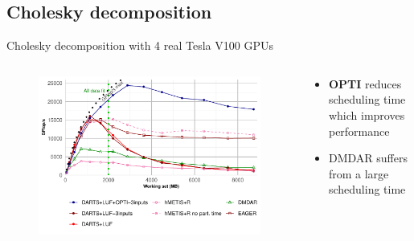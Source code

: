 \documentclass{libs/ufc_format}
\newcommand{\OPTI}{\textbf{OPTI}\xspace}
\begin{document}
\subsection{Cholesky decomposition}
\begin{frame}{Cholesky decomposition with 4 real Tesla V100 GPUs}
    \begin{columns}{}
		\begin{column}{0.7\textwidth}
		\begin{figure}
			\center\includegraphics[scale = 0.45]{Images/GF_dynamic_data_aware_no_hfp_gemini-1-fgcs_4GPU.pdf}
		\end{figure}
		\end{column}
		\begin{column}{0.3\textwidth}
		\begin{itemize}
			\item \OPTI reduces scheduling time which improves performance
			\item DMDAR suffers from a large scheduling time
		\end{itemize}
		\end{column}
	\end{columns}
\end{frame}

\end{document}

